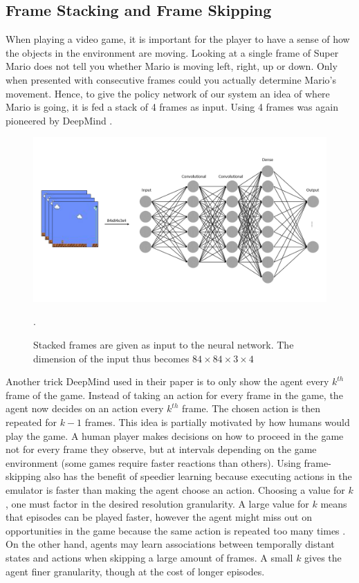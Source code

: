 \documentclass[notitlepage,a4paper,11pt]{article}
\begin{document}
\subsection{Frame Stacking and Frame Skipping} \label{frame_stacking_skipping}
When playing a video game, it is important for the player to have a sense of how the objects in the environment are moving. Looking at a single frame of Super Mario does not tell you whether Mario is moving left, right, up or down. Only when presented with consecutive frames could you actually determine Mario's movement. Hence, to give the policy network of our system an idea of where Mario is going, it is fed a stack of 4 frames as input. Using 4 frames was again pioneered by DeepMind \cite{DBLP:journals/corr/MnihKSGAWR13}.

\begin{figure}[!htb]
\centering
\includegraphics[trim={0 2cm 0 2cm}, clip, width=.75\linewidth]{figs/frame_stacking_nn.png}
\caption{Stacked frames are given as input to the neural network. The dimension of the input thus becomes $84 \times 84 \times 3 \times 4$}.
\end{figure}

Another trick DeepMind used in their paper is to only show the agent every $k^{th}$ frame of the game. Instead of taking an action for every frame in the game, the agent now decides on an action every $k^{th}$ frame. The chosen action is then repeated for $k-1$ frames. This idea is partially motivated by how humans would play the game. A human player makes decisions on how to proceed in the game not for every frame they observe, but at intervals depending on the game environment (some games require faster reactions than others). Using frame-skipping also has the benefit of speedier learning because executing actions in the emulator is faster than making the agent choose an action. Choosing a value for $k$, one must factor in the desired resolution granularity. A large value for $k$ means that episodes can be played faster, however the agent might miss out on opportunities in the game because the same action is repeated too many times \cite{braylan2015frame}. On the other hand, agents may learn associations between temporally distant states and actions when skipping a large amount of frames. A small $k$ gives the agent finer granularity, though at the cost of longer episodes. 
\end{document}
